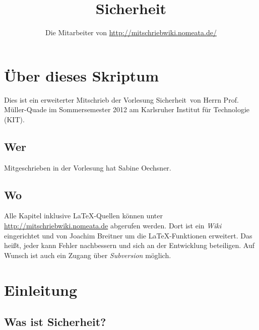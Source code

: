 \documentclass[a4paper,twoside,DIV15,BCOR12mm]{scrbook}
\author{Die Mitarbeiter von \url{http://mitschriebwiki.nomeata.de/}}
\title{Sicherheit}
\begin{document}
\maketitle

\renewcommand{\thechapter}{\Roman{chapter}}
\tableofcontents


\chapter{Über dieses Skriptum}
Dies ist ein erweiterter Mitschrieb der Vorlesung \glqq Sicherheit\grqq\ von Herrn Prof. Müller-Quade im
Sommersemester 2012 am Karlsruher Institut für Technologie (KIT).

\section{Wer}
Mitgeschrieben in der Vorlesung hat Sabine Oechsner.

\section{Wo}
Alle Kapitel inklusive \LaTeX-Quellen können unter \url{http://mitschriebwiki.nomeata.de} abgerufen werden.
Dort ist ein \emph{Wiki} eingerichtet und von Joachim Breitner um die \LaTeX-Funktionen erweitert.
Das heißt, jeder kann Fehler nachbessern und sich an der Entwicklung
beteiligen. Auf Wunsch ist auch ein Zugang über \emph{Subversion} möglich.




\chapter{Einleitung}

\section{Was ist Sicherheit?}
\end{document}
